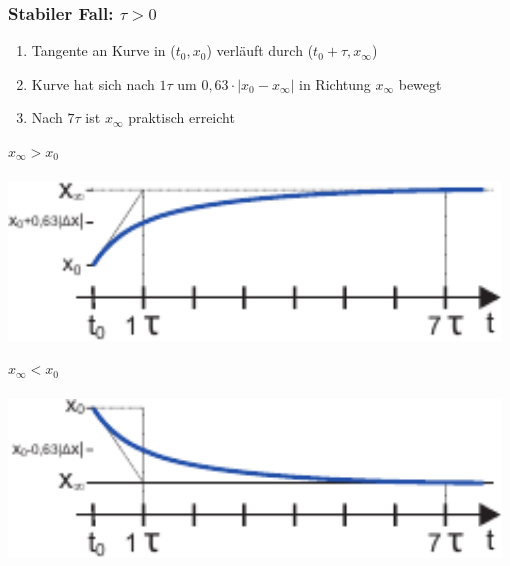 \documentclass[a4paper,twocolumn,10pt]{article}
\begin{document}
\subsubsection*{Stabiler Fall: $\tau>0$}
\begin{enumerate}[label=-,leftmargin=3mm]
	\item Tangente an Kurve in ($t_0,x_0$) verläuft durch ($t_0+\tau,x_\infty$)
	\item Kurve hat sich nach $1\tau$ um $0,63\cdot |x_0-x_\infty|$ in Richtung $x_\infty$ bewegt
	\item Nach $7\tau$ ist $x_\infty$ praktisch erreicht
\end{enumerate}
\begin{minipage}[t]{0.23\textwidth}
$x_\infty > x_0$\\\\
\includegraphics[width=0.98\textwidth]{img/Zeitverlauf1}\\
\end{minipage}
\hfill
\begin{minipage}[t]{0.23\textwidth}
$x_\infty < x_0$\\\\
\includegraphics[width=0.98\textwidth]{img/Zeitverlauf2}\\
\end{minipage}
\end{document}
